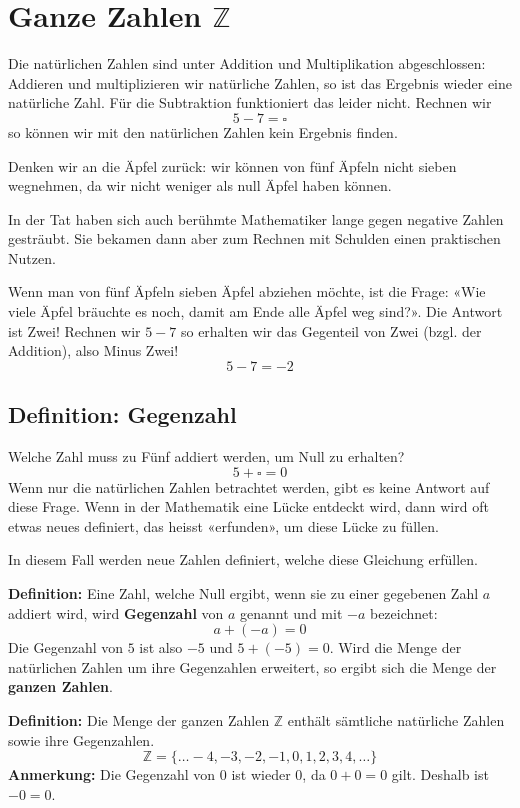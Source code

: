 \newpage
\section{Ganze Zahlen $\mathbb{Z}$}

Die natürlichen Zahlen sind unter Addition und Multiplikation abgeschlossen: Addieren und multiplizieren wir natürliche Zahlen, so ist das Ergebnis wieder eine natürliche Zahl. Für die Subtraktion funktioniert das leider nicht. Rechnen wir
\[
  5-7 = \square
\]
so können wir mit den natürlichen Zahlen kein Ergebnis finden.

Denken wir an die Äpfel zurück: wir können von fünf Äpfeln nicht sieben wegnehmen, da wir nicht weniger als null Äpfel haben können.

In der Tat haben sich auch berühmte Mathematiker lange gegen negative Zahlen gesträubt. Sie bekamen dann aber zum Rechnen mit Schulden einen praktischen Nutzen.

Wenn man von fünf Äpfeln sieben Äpfel abziehen möchte, ist die Frage: «Wie viele Äpfel bräuchte es noch, damit am Ende alle Äpfel weg sind?». Die Antwort ist Zwei! Rechnen wir $5-7$ so erhalten wir das Gegenteil von Zwei (bzgl. der Addition), also Minus Zwei!
\[
  5-7 = -2
\]

\subsection{Definition: Gegenzahl}

Welche Zahl muss zu Fünf addiert werden, um Null zu erhalten?
\[
  5 + \square = 0
\]
Wenn nur die natürlichen Zahlen betrachtet werden, gibt es keine Antwort auf diese Frage. Wenn in der Mathematik eine Lücke entdeckt wird, dann wird oft etwas neues definiert, das heisst «erfunden», um diese Lücke zu füllen.

In diesem Fall werden neue Zahlen definiert, welche diese Gleichung erfüllen.

\textbf{Definition:} Eine Zahl, welche Null ergibt, wenn sie zu einer gegebenen Zahl $a$ addiert wird, wird \textbf{Gegenzahl} von $a$ genannt und mit $-a$ bezeichnet:
\[
  a + (-a) = 0
\]
Die Gegenzahl von $5$ ist also $-5$ und $5 + (-5) = 0$. Wird die Menge der natürlichen Zahlen um ihre Gegenzahlen erweitert, so ergibt sich die Menge der \textbf{ganzen Zahlen}.

\textbf{Definition:} Die Menge der ganzen Zahlen $\mathbb{Z}$ enthält sämtliche natürliche Zahlen sowie ihre Gegenzahlen.
\[
  \mathbb{Z} = \{\ldots -4, -3, -2, -1, 0, 1, 2, 3, 4, \ldots\}
\]
\textbf{Anmerkung:} Die Gegenzahl von $0$ ist wieder $0$, da $0+0 = 0$ gilt. Deshalb ist $-0 = 0$.

